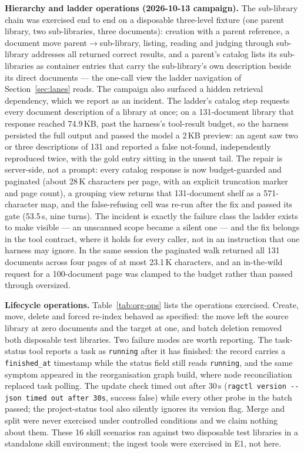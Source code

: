 \textbf{Hierarchy and ladder operations (2026-10-13 campaign).} The
sub-library chain was exercised end to end on a disposable three-level
fixture (one parent library, two sub-libraries, three documents): creation
with a parent reference, a document move parent$\to$sub-library, listing,
reading and judging through sub-library addresses all returned correct
results, and a parent's catalog lists its sub-libraries as container entries
that carry the sub-library's own description beside its direct documents ---
the one-call view the ladder navigation of Section~\ref{sec:lanes} reads.
The campaign also surfaced a hidden retrieval dependency, which we report as
an incident. The ladder's catalog step requests every document description
of a library at once; on a 131-document library that response reached
74.9\,KB, past the harness's tool-result budget, so the harness persisted
the full output and passed the model a 2\,KB preview: an agent saw two or
three descriptions of 131 and reported a false not-found, independently
reproduced twice, with the gold entry sitting in the unsent tail. The repair
is server-side, not a prompt: every catalog response is now budget-guarded
and paginated (about 28\,K characters per page, with an explicit truncation
marker and page count), a grouping view returns that 131-document shelf as a
571-character map, and the false-refusing cell was re-run after the fix and
passed its gate (53.5\,s, nine turns). The incident is exactly the failure
class the ladder exists to make visible --- an unscanned scope became a
silent one --- and the fix belongs in the tool contract, where it holds for
every caller, not in an instruction that one harness may ignore. In the same
session the paginated walk returned all 131 documents across four pages of
at most 23.1\,K characters, and an in-the-wild request for a 100-document
page was clamped to the budget rather than passed through oversized.

\textbf{Lifecycle operations.} Table~\ref{tab:org-ops} lists the operations exercised. Create, move, delete and forced re-index behaved as specified: the move left the source library at zero documents and the target at one, and batch deletion removed both disposable test libraries. Two failure modes are worth reporting. The task-status tool reports a task as \texttt{running} after it has finished: the record carries a \texttt{finished\_at} timestamp while the status field still reads \texttt{running}, and the same symptom appeared in the reorganisation graph build, where node reconciliation replaced task polling. The update check timed out after 30\,s (\texttt{ragctl version -{}-json timed out after 30s}, success false) while every other probe in the batch passed; the project-status tool also silently ignores its version flag. Merge and split were never exercised under controlled conditions and we claim nothing about them. These 16 skill scenarios ran against two disposable test libraries in a standalone skill environment; the ingest tools were exercised in E1, not here.



